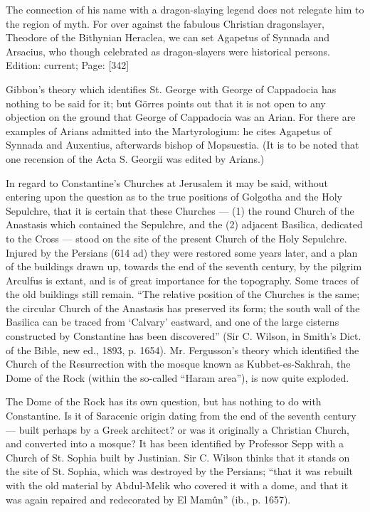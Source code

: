 The connection of his name with a dragon-slaying legend does not relegate him to the region of myth. For over against the fabulous Christian dragonslayer, Theodore of the Bithynian Heraclea, we can set Agapetus of Synnada and Arsacius, who though celebrated as dragon-slayers were historical persons.
Edition: current; Page: [342]

Gibbon\texthebrew{}’s theory which identifies St. George with George of Cappadocia has nothing to be said for it; but Görres points out that it is not open to any objection on the ground that George of Cappadocia was an Arian. For there are examples of Arians admitted into the Martyrologium: he cites Agapetus of Synnada and Auxentius, afterwards bishop of Mopsuestia. (It is to be noted that one recension of the Acta S. Georgii was edited by Arians.)


In regard to Constantine\texthebrew{}’s Churches at Jerusalem it may be said, without entering upon the question as to the true positions of Golgotha and the Holy Sepulchre, that it is certain that these Churches \texthebrew{—} (1) the round Church of the Anastasis which contained the Sepulchre, and the (2) adjacent Basilica, dedicated to the Cross \texthebrew{—} stood on the site of the present Church of the Holy Sepulchre. Injured by the Persians (614 ad) they were restored some years later, and a plan of the buildings drawn up, towards the end of the seventh century, by the pilgrim Arculfus is extant, and is of great importance for the topography. Some traces of the old buildings still remain. \texthebrew{“}The relative position of the Churches is the same; the circular Church of the Anastasis has preserved its form; the south wall of the Basilica can be traced from \texthebrew{‘}Calvary\texthebrew{}’ eastward, and one of the large cisterns constructed by Constantine has been discovered\texthebrew{}” (Sir C. Wilson, in Smith\texthebrew{}’s Dict. of the Bible, new ed., 1893, p. 1654). Mr. Fergusson\texthebrew{}’s theory which identified the Church of the Resurrection with the mosque known as Kubbet-es-Sakhrah, the Dome of the Rock (within the so-called \texthebrew{“}Haram area\texthebrew{}”), is now quite exploded.

The Dome of the Rock has its own question, but has nothing to do with Constantine. Is it of Saracenic origin dating from the end of the seventh century \texthebrew{—} built perhaps by a Greek architect? or was it originally a Christian Church, and converted into a mosque? It has been identified by Professor Sepp with a Church of St. Sophia built by Justinian. Sir C. Wilson thinks that it stands on the site of St. Sophia, which was destroyed by the Persians; \texthebrew{“}that it was rebuilt with the old material by Abdul-Melik who covered it with a dome, and that it was again repaired and redecorated by El Mamûn\texthebrew{}” (ib., p. 1657).


